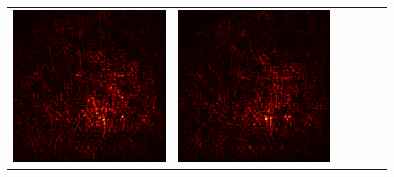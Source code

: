 \documentclass[preprint,12pt]{elsarticle}
\begin{document}
\begin{figure}[p]
\begin{tabular}{cccccc}
  \includegraphics[scale=\scale]{../visualizations/examples/imagenette/resnet18/positive_saliency_map/1.png} & 
  \includegraphics[scale=\scale]{../visualizations/examples/imagenette/resnet18/negative_saliency_map/1.png} & 

\end{tabular}
\end{figure}
\end{document}
